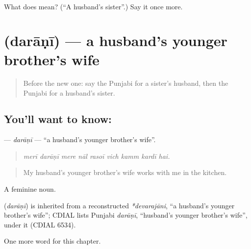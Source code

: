 \begin{tcolorbox}[breakable,colback=teal!4,colframe=teal!35!black,title={Before you move on}]
What does  mean? (\textquotedblleft{}A husband's sister\textquotedblright{}.) Say it once more.
\end{tcolorbox}
\section[\texorpdfstring{\pa{ਦਰਾਣੀ} (darāṇī)}{ਦਰਾਣੀ (darāṇī)}]{ (darāṇī) — a husband's younger brother's wife}

\label{lesson:PA-C330-darani}



\begin{quote}
Before the new one: say the Punjabi for a sister's husband, then the Punjabi for a husband's sister.
\end{quote}

\subsection*{You'll want to know: }
\textbf{} — \emph{darāṇī} — \textquotedblleft{}a husband's younger brother's wife\textquotedblright{}.

\begin{quote}
        
\end{quote}

\begin{quote}
\emph{merī darāṇī mere nāl rasoī vich kamm kardī hai.}
\end{quote}

\begin{quote}
My husband's younger brother's wife works with me in the kitchen.
\end{quote}

A feminine noun.

\begin{cousinweb}
\textbf{} (\emph{darāṇī}) is inherited from a reconstructed \emph{*devarajāni}, \textquotedblleft{}a husband's younger brother's wife\textquotedblright{}; CDIAL lists Punjabi \emph{darāṇī}, \textquotedblleft{}husband's younger brother's wife\textquotedblright{}, under it (CDIAL 6534).
\end{cousinweb}

\begin{grammarlens}[title={What you've built}]
One more word for this chapter.
\end{grammarlens}

